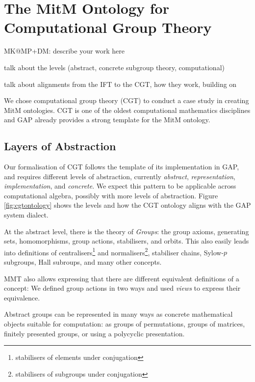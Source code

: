 \section{The MitM Ontology for Computational Group Theory}\label{sec:cgt}
\begin{todolist}{MK@MP+DM: describe your work here}
\item talk about the levels (abstract, concrete subgroup theory, computational)
\item talk about alignments from the IFT to the CGT, how they work, building
  on~\cite{MueRoYuRa:abtafs17,MueGauKal:cacfms17} 
\end{todolist}

We chose computational group theory (CGT) to conduct a case study in creating
MitM ontologies. CGT is one of the oldest computational mathematics disciplines
and GAP already provides a strong template for the MitM ontology.

\subsection{Layers of Abstraction}


Our formalisation of CGT follows the template of its implementation in GAP, and
requires different levels of abstraction, currently \emph{abstract},
\emph{representation}, \emph{implementation}, and \emph{concrete}.
We expect this pattern to be applicable across computational algebra, possibly
with more levels of abstraction. Figure \ref{fig:cgtontology} shows the
levels and how the CGT ontology aligns with the GAP system dialect.


\medskip

At the abstract level, there is the theory of \emph{Groups}: the group axioms,
generating sets, homomorphisms, group actions, stabilisers, and orbits. This
also easily leads into definitions of centralisers\footnote{stabilisers of
elements under conjugation} and normalisers\footnote{stabilisers of subgroups under
conjugation}, stabiliser chains, Sylow-$p$ subgroups, Hall subroups, and many
other concepts. 

MMT also allows expressing that there are different equivalent definitions of a
concept: We defined group actions in two ways and used \emph{views} to express
their equivalence.

\smallskip

Abstract groups can be represented in many ways as concrete mathematical
objects suitable for computation: as groups of permutations, groups of matrices,
finitely presented groups, or using a polycyclic presentation.

